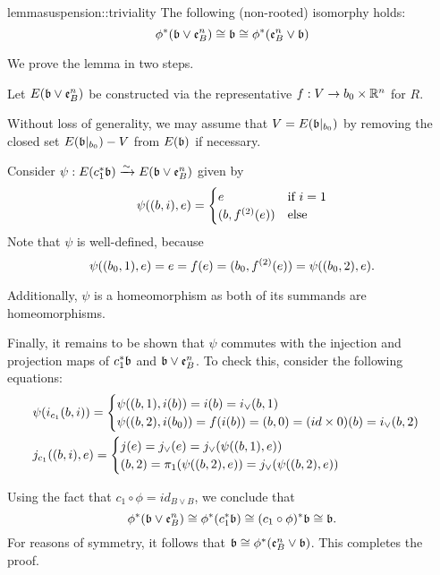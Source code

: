 \begin{mystatement}{lemma}{suspension::triviality}
    The following (non-rooted) isomorphy holds:
    \[ \ind{\phi}(\bb \vee \be{B}) \cong \bb \cong \ind{\phi}(\be{B} \vee \bb) \]
\end{mystatement}

\begin{myproof}
    We prove the lemma in two steps.
    \begin{steps}
        
        Let $E(\bb \vee \be{B})$ be constructed via 
        the representative $f: V \to b_0 \cross \R^n$ for $R$.

        Without loss of generality, we may assume that
        $V = E(\bbb)$ by removing the closed set $E(\bbb) - V$ from $E(\bb)$ if necessary.

        Consider $\psi: E(\ind{c_1}\bb) \isomto E(\bb \vee \be{B})$ given by
        \[ \psi((b, i), e) = \case{e}{(b, \snd{f}(e))}{i = 1} \]
        Note that $\psi$ is well-defined, because
        \[ \psi((b_0, 1), e) = e = f(e) = (b_0, \snd{f}(e)) = \psi((b_0, 2), e). \]

        Additionally, $\psi$ is a homeomorphism as both of its summands are homeomorphisms.

        Finally, it remains to be shown that $\psi$
        commutes with the injection and projection maps of $\ind{c_1}\bb$ and $\bb \vee \be{B}$.
        To check this, consider the following equations:
        \begin{align}
            &\psi(i_{c_1}(b, i)) = \casenif{\psi((b, 1), i(b)) = i(b) = i_\vee(b, 1)}{\psi((b, 2), i(b_0)) = f(i(b)) = (b, 0) = (id \cross 0)(b) = i_\vee(b, 2)} \\
            &j_{c_1}((b, i), e) = \casenif{j(e) = j_\vee(e) = j_\vee(\psi((b, 1), e))}{(b, 2) = \pi_1(\psi((b, 2), e)) = j_\vee(\psi((b, 2), e))}
        \end{align}
        

        Using the fact that $c_1 \circ \phi = id_{B \vee B}$, we conclude that
        \[ \ind{\phi}(\bb \vee \be{B}) \cong \ind{\phi}(\ind{c_1}\bb) \cong \ind{(c_1 \circ \phi)}\bb \cong \bb. \]
        For reasons of symmetry, it follows that $\bb \cong \ind{\phi}(\be{B} \vee \bb)$.
        This completes the proof.
    \end{steps}
\end{myproof}
